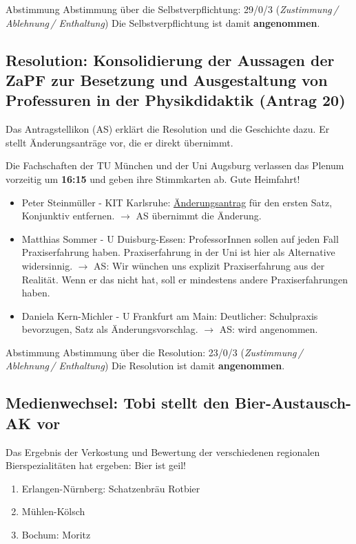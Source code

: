     \begin{success}{Abstimmung}
      Abstimmung über die Selbstverpflichtung: 29/0/3 (\textit{Zustimmung\,/ Ablehnung\,/ Enthaltung})
      Die Selbstverpflichtung ist damit \textbf{angenommen}.
    \end{success}

  \subsection*{Resolution: Konsolidierung der Aussagen der ZaPF zur Besetzung und Ausgestaltung von Professuren in der Physikdidaktik (Antrag 20)}
    Das Antragstellikon (AS) erklärt die Resolution und die Geschichte dazu. Er stellt Änderungsanträge vor, die er direkt übernimmt.

    \begin{info}{}
      Die Fachschaften der TU München und der Uni Augsburg verlassen das Plenum vorzeitig um \textbf{16:15} und geben ihre Stimmkarten ab. Gute Heimfahrt!
    \end{info}

    \begin{itemize}
      \item Peter Steinmüller - KIT Karlsruhe:  \uline{Änderungsantrag} für den ersten Satz, Konjunktiv entfernen.
        $\rightarrow$ AS übernimmt die Änderung.
      \item Matthias Sommer - U Duisburg-Essen:  ProfessorInnen sollen auf jeden Fall Praxiserfahrung haben. Praxiserfahrung in der Uni ist hier als Alternative widersinnig.
        $\rightarrow$ AS: Wir wünchen uns explizit Praxiserfahrung aus der Realität. Wenn er das nicht hat, soll er mindestens andere Praxiserfahrungen haben.
      \item Daniela Kern-Michler - U Frankfurt am Main:  Deutlicher: Schulpraxis bevorzugen, Satz als Änderungsvorschlag.
        $\rightarrow$ AS: wird angenommen.
    \end{itemize}

    \begin{success}{Abstimmung}
      Abstimmung über die Resolution: 23/0/3 (\textit{Zustimmung\,/ Ablehnung\,/ Enthaltung})
      Die Resolution ist damit \textbf{angenommen}.
    \end{success}

  \subsection*{Medienwechsel: Tobi stellt den Bier-Austausch-AK vor}
    Das Ergebnis der Verkostung und Bewertung der verschiedenen regionalen Bierspezialitäten hat ergeben: Bier ist geil!
    \begin{enumerate}
      \item Erlangen-Nürnberg: Schatzenbräu Rotbier
      \item Mühlen-Kölsch
      \item Bochum: Moritz
    \end{enumerate}


